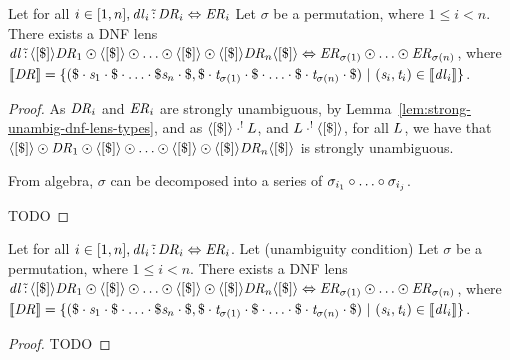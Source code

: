 \documentclass[numbers,10pt,preprint\ifanon ,nocopyrightspace\fi]{sigplanconf}
\begin{document}
\begin{lemma}
  Let for all $i \in [1,n], \mathit{dl}_i \,\tilde{:}\,
  \mathit{DR}_i \Leftrightarrow \mathit{ER}_i$
  Let $\sigma$ be a permutation, where $1 \leq i < n$.
  There exists a DNF lens $\mathit{dl} \,\tilde{:}\, \langle[\$]\rangle
  \mathit{DR}_1 \odot \langle[\$]\rangle \odot
  \ldots \odot \langle[\$]\rangle \odot
  \langle[\$]\rangle \mathit{DR}_n \langle[\$]\rangle \Leftrightarrow
  \mathit{ER}_{\sigma(1)} \odot \ldots \odot
  \mathit{ER}_{\sigma(n)}$, where $[ \! [\mathit{DR}] \! ] =
  \{(\$\cdot\mathit{s}_1\cdot\$\cdot\ldots\cdot\$\mathit{s}_n\cdot\$,
    \$\cdot\mathit{t}_{\sigma(1)}\cdot\$\cdot\ldots\cdot\$\cdot\mathit{t}_{\sigma(n)}\cdot\$)
    ~|~
  (\mathit{s}_i,\mathit{t}_i) \in [ \! [\mathit{dl}_i] \! ]\}$.
\end{lemma}
\begin{proof}
  As $\mathit{DR}_i$ and
  $\mathit{ER}_i$ are strongly unambiguous, by
  Lemma~\ref{lem:strong-unambig-dnf-lens-types}, and as
  $\langle[\$]\rangle \cdot^! L$, and
  $L \cdot^! \langle[\$]\rangle$, for all $L$,
  we have that $\langle[\$]\rangle \odot \mathit{DR}_1 \odot \langle[\$]\rangle \odot
  \ldots \odot \langle[\$]\rangle \odot
  \langle[\$]\rangle \mathit{DR}_n \langle[\$]\rangle$ is strongly
  unambiguous.

  From algebra, $\sigma$ can be decomposed into a series of $\sigma_{i_1}
  \circ \ldots \circ \sigma_{i_j}$.

TODO
\end{proof}

\begin{lemma}
  \label{lem:conat-perms}
  Let for all $i \in [1,n], \mathit{dl}_i \,\tilde{:}\,
  \mathit{DR}_i \Leftrightarrow \mathit{ER}_i$.
  Let (unambiguity condition)
  Let $\sigma$ be a permutation, where $1 \leq i < n$.
  There exists a DNF lens $\mathit{dl} \,\tilde{:}\, \langle[\$]\rangle
  \mathit{DR}_1 \odot \langle[\$]\rangle \odot
  \ldots \odot \langle[\$]\rangle \odot
  \langle[\$]\rangle \mathit{DR}_n \langle[\$]\rangle \Leftrightarrow
  \mathit{ER}_{\sigma(1)} \odot \ldots \odot
  \mathit{ER}_{\sigma(n)}$, where $[ \! [\mathit{DR}] \! ] =
  \{(\$\cdot\mathit{s}_1\cdot\$\cdot\ldots\cdot\$\mathit{s}_n\cdot\$,
    \$\cdot\mathit{t}_{\sigma(1)}\cdot\$\cdot\ldots\cdot\$\cdot\mathit{t}_{\sigma(n)}\cdot\$)
    ~|~
  (\mathit{s}_i,\mathit{t}_i) \in [ \! [\mathit{dl}_i] \! ]\}$.
\end{lemma}
\begin{proof}
TODO
\end{proof}
\end{document}

